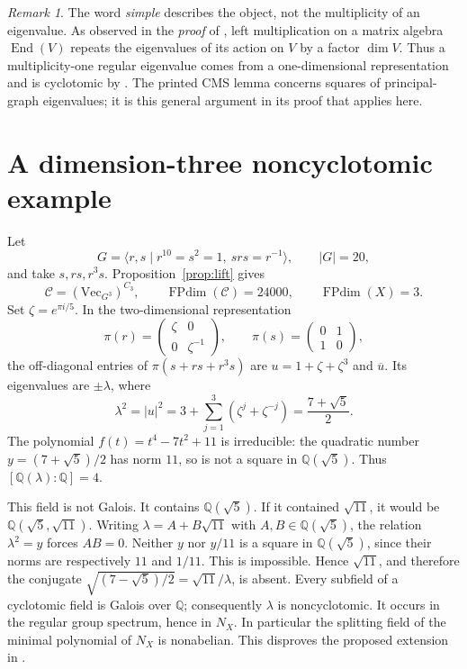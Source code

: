 \documentclass[11pt]{amsart}
\theoremstyle{remark}
\newtheorem{remark}[theorem]{Remark}
\newcommand{\VEC}{\mathrm{Vec}}
\newcommand{\FPdim}{\operatorname{FPdim}}
\newcommand{\Q}{\mathbb Q}
\begin{document}
\begin{remark}\label{rem:mult}
The word \emph{simple} describes the object, not the multiplicity of an
eigenvalue. As observed in the \emph{proof} of
\cite[Lemma 3.0.7]{CMS}, left multiplication on a matrix algebra
$\operatorname{End}(V)$ repeats the eigenvalues of its action on $V$
by a factor $\dim V$. Thus a multiplicity-one regular eigenvalue comes
from a one-dimensional representation and is cyclotomic by \cite{ENO}.
The printed CMS lemma concerns squares of principal-graph eigenvalues;
it is this general argument in its proof that applies here.
\end{remark}

\section{A dimension-three noncyclotomic example}

Let
\[
 G=\langle r,s\mid r^{10}=s^2=1,\ srs=r^{-1}\rangle,\qquad |G|=20,
\]
and take $s,rs,r^3s$. Proposition~\ref{prop:lift} gives
\[
 \mathcal C=(\VEC_{G^3})^{C_3},\qquad
 \FPdim(\mathcal C)=24000,\qquad \FPdim(X)=3.
\]
Set $\zeta=e^{\pi i/5}$. In the two-dimensional representation
\[
 \pi(r)=\begin{pmatrix}\zeta&0\\0&\zeta^{-1}\end{pmatrix},
 \qquad \pi(s)=\begin{pmatrix}0&1\\1&0\end{pmatrix},
\]
the off-diagonal entries of $\pi(s+rs+r^3s)$ are
$u=1+\zeta+\zeta^3$ and $\overline u$. Its eigenvalues are
$\pm\lambda$, where
\[
 \lambda^2=|u|^2
 =3+\sum_{j=1}^3(\zeta^j+\zeta^{-j})
 =\frac{7+\sqrt5}{2}.
\]
The polynomial $f(t)=t^4-7t^2+11$ is irreducible: the quadratic number
$y=(7+\sqrt5)/2$ has norm $11$, so is not a square in $\Q(\sqrt5)$.
Thus $[\Q(\lambda):\Q]=4$.

This field is not Galois. It contains $\Q(\sqrt5)$. If it contained
$\sqrt{11}$, it would be $\Q(\sqrt5,\sqrt{11})$. Writing
$\lambda=A+B\sqrt{11}$ with $A,B\in\Q(\sqrt5)$, the relation
$\lambda^2=y$ forces $AB=0$. Neither $y$ nor $y/11$ is a square
in $\Q(\sqrt5)$, since their norms are respectively $11$ and $1/11$.
This is impossible. Hence $\sqrt{11}$, and therefore the conjugate
$\sqrt{(7-\sqrt5)/2}=\sqrt{11}/\lambda$, is absent.
Every subfield of a cyclotomic field is Galois over $\Q$; consequently
$\lambda$ is noncyclotomic.
It occurs in the regular group spectrum, hence in $N_X$.
In particular the splitting field of the minimal polynomial of $N_X$
is nonabelian. This disproves the proposed extension in
\cite[Question 2.12]{LPR}.
\end{document}
